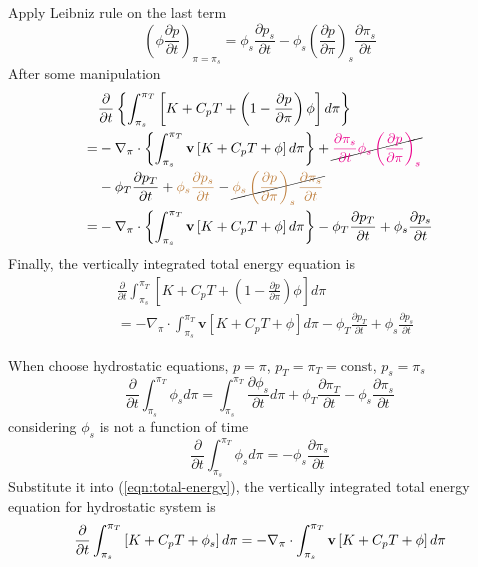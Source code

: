 \documentclass[12pt]{article}
\numberwithin{equation}{section}
\newcommand{\pd}[2]{\frac{\partial #1}{\partial #2}}
\newcommand{\pdt}[1]{\pd{#1}{t}}
\renewcommand{\vec}[1]{\mathbf{#1}}
\renewcommand{\div}[2][\pi]{\nabla_{#1} \cdot #2}
\begin{document}
Apply Leibniz rule on the last term
\begin{equation}
  \left(\phi \pdt{p}\right)_{\pi = \pi_s} = \phi_s \pdt{p_s} - \phi_s \left(\pd{p}{\pi}\right)_s \pdt{\pi_s}
\end{equation}
After some manipulation
\begin{align*}
  & \pdt{} \left\{\int_{\pi_s}^{\pi_T} \left[K + C_p T + \left(1 - \pd{p}{\pi}\right) \phi\right] d\pi\right\} \\
  = & - \div{\left\{\int_{\pi_s}^{\pi_T} \vec{v} \left[K + C_p T + \phi\right] d\pi\right\}} + \cancel{\color{magenta}\pdt{\pi_s} \phi_s \left(\pd{p}{\pi}\right)_s} \\
  & - \phi_T \pdt{p_T} + {\color{brown}\phi_s \pdt{p_s}} - \cancel{\color{brown}\phi_s \left(\pd{p}{\pi}\right)_s \pdt{\pi_s}} \\
  = & - \div{\left\{\int_{\pi_s}^{\pi_T} \vec{v} \left[K + C_p T + \phi\right] d\pi\right\}} - \phi_T \pdt{p_T} + \phi_s \pdt{p_s}
\end{align*}
Finally, the vertically integrated total energy equation is
\begin{equation}
  \begin{split}
    & \pdt{} \int_{\pi_s}^{\pi_T} \left[K + C_p T + \left(1 - \pd{p}{\pi}\right) \phi\right] d\pi \\
    & = - \div{\int_{\pi_s}^{\pi_T} \vec{v} \left[K + C_p T + \phi\right] d\pi} - \phi_T \pdt{p_T} + \phi_s \pdt{p_s}
  \end{split}
  \label{eqn:total-energy}
\end{equation}

\pagebreak
When choose hydrostatic equations, $p = \pi$, $p_T = \pi_T = \text{const}$, $p_s = \pi_s$
\begin{equation*}
  \pdt{} \int_{\pi_s}^{\pi_T} \phi_s d\pi = \int_{\pi_s}^{\pi_T} \pdt{\phi_s} d\pi + \phi_T \pdt{\pi_T} - \phi_s \pdt{\pi_s}
\end{equation*}
considering $\phi_s$ is not a function of time
\begin{equation}
  \pdt{} \int_{\pi_s}^{\pi_T} \phi_s d\pi = - \phi_s \pdt{\pi_s}
\end{equation}
Substitute it into (\ref{eqn:total-energy}), the vertically integrated total energy equation for hydrostatic system is
\begin{equation}
  \pdt{} \int_{\pi_s}^{\pi_T} \left[K + C_p T + \phi_s\right] d\pi = - \div{\int_{\pi_s}^{\pi_T} \vec{v} \left[K + C_p T + \phi\right] d\pi} \\
\end{equation}
\end{document}
